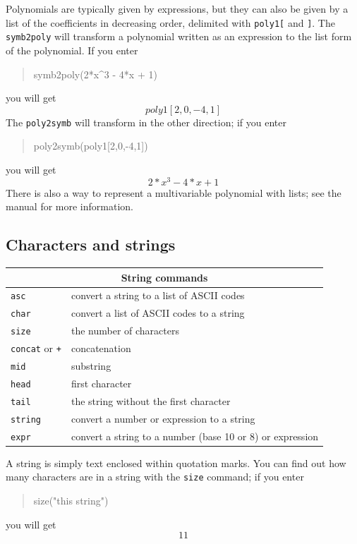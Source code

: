 \documentclass{article}
\newcommand{\xcasin}[1]
{\begin{quote}\ttfamily
#1
\end{quote}}
\newcommand{\xcasout}[1]
{\begin{equation*}
#1
\end{equation*}}
\begin{document}
Polynomials are typically given by expressions, but they can also be
given by a list of the coefficients in decreasing order, delimited
with \texttt{poly1[} and \texttt{]}.  The \texttt{symb2poly} will
transform a polynomial written as an expression to the list form of
the polynomial.  If you enter
\xcasin{symb2poly(2*x\^{}3 - 4*x + 1)}
you will get
\xcasout{poly1[2,0,-4,1]}
The \texttt{poly2symb} will transform in the other direction; if you
enter
\xcasin{poly2symb(poly1[2,0,-4,1])}
you will get
\xcasout{2*x^3 - 4*x + 1}
There is also a way to represent a multivariable polynomial with
lists; see the manual for more information.


\subsection{Characters and strings}

\begin{center}
\begin{tabular}{|p{}|p{}|}
\hline
\multicolumn{2}{|c|}{\textbf{String commands}}\\
\hline\hline
\texttt{asc} & convert a string to a list of ASCII codes \\
\texttt{char} & convert a list of ASCII codes to a string\\
\texttt{size} & the number of characters \\
\texttt{concat} or \texttt{+} & concatenation  \\
\texttt{mid}& substring\\
\texttt{head}& first character  \\
\texttt{tail}& the string without the first character\\
\texttt{string}& convert a number or expression to a string  \\
\texttt{expr}& convert a string to a number (base 10 or 8) or expression \\
\hline
\end{tabular}
\end{center}

A string is simply text enclosed within quotation marks.
You can find out how many characters are in a string with the
\texttt{size} command; if you enter
\xcasin{size("this string")}
you will get
\xcasout{11}
\end{document}
